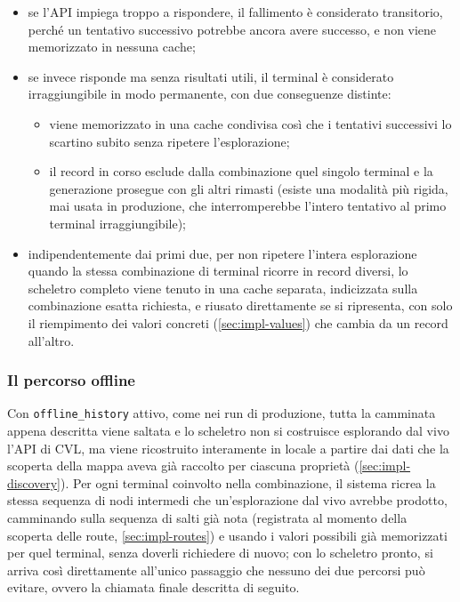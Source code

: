 \documentclass[12pt,a4paper,openright,twoside]{book}
\begin{document}
\begin{itemize}
    \item se l'API impiega troppo a rispondere, il fallimento è considerato
          transitorio, perché un tentativo successivo potrebbe ancora avere
          successo, e non viene memorizzato in nessuna cache;
    \item se invece risponde ma senza risultati utili, il terminal è considerato
          irraggiungibile in modo permanente, con due conseguenze distinte:
          \begin{itemize}
              \item viene memorizzato in una cache condivisa così che i
                    tentativi successivi lo scartino subito senza ripetere
                    l'esplorazione;
              \item il record in corso esclude dalla combinazione quel singolo
                    terminal e la generazione prosegue con gli altri rimasti
                    (esiste una modalità più rigida, mai usata in produzione,
                    che interromperebbe l'intero tentativo al primo terminal
                    irraggiungibile);
          \end{itemize}
    \item indipendentemente dai primi due, per non ripetere l'intera
          esplorazione quando la stessa combinazione di terminal ricorre in
          record diversi, lo scheletro completo viene tenuto in una cache
          separata, indicizzata sulla combinazione esatta richiesta, e riusato
          direttamente se si ripresenta, con solo il riempimento dei valori
          concreti (\cref{sec:impl-values}) che cambia da un record all'altro.
\end{itemize}

\subsubsection{Il percorso offline}

Con \texttt{offline\_history} attivo, come nei run di produzione, tutta la
camminata appena descritta viene saltata e lo scheletro non si costruisce
esplorando dal vivo l'API di CVL, ma viene ricostruito interamente in locale a
partire dai dati che la scoperta della mappa aveva già raccolto per ciascuna
proprietà (\cref{sec:impl-discovery}). Per ogni terminal coinvolto nella
combinazione, il sistema ricrea la stessa sequenza di nodi intermedi che
un'esplorazione dal vivo avrebbe prodotto, camminando sulla sequenza di salti
già nota (registrata al momento della scoperta delle route,
\cref{sec:impl-routes}) e usando i valori possibili già memorizzati per quel
terminal, senza doverli richiedere di nuovo; con lo scheletro pronto, si arriva
così direttamente all'unico passaggio che nessuno dei due percorsi può evitare,
ovvero la chiamata finale descritta di seguito.
\end{document}
